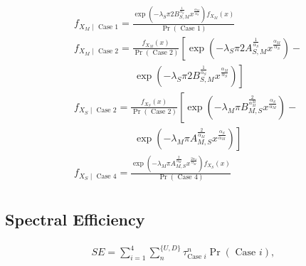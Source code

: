 \documentclass[conference]{IEEEtran}
\begin{document}
\begin{CJK*}{UTF8}{bsmi}
\begin{equation}
\begin{aligned}
& f_{X_M \mid \text { Case } 1}=\frac{\exp \left(-\lambda_S \pi 2 B_{S, M}^{\frac{1}{\alpha_S}} x^{\frac{\alpha_M}{\alpha_S}}\right) f_{X_M}(x)}{\operatorname{Pr}(\text { Case } 1)} \\
& f_{X_M \mid \text { Case } 2}=\frac{f_{X_M}(x)}{\operatorname{Pr}(\text { Case } 2)}\left[\exp \left(-\lambda_S \pi 2 A_{S, M}^{\frac{1}{\alpha_S}} x^{\frac{\alpha_M}{\alpha_S}}\right)-\right. \\
& \qquad\qquad\qquad\left.\exp \left(-\lambda_S \pi 2 B_{S, M}^{\frac{1}{\alpha_S}} x^{\frac{\alpha_M}{\alpha_S}}\right)\right] \\
& f_{X_S \mid \text { Case } 2}=\frac{f_{X_S}(x)}{\operatorname{Pr}(\text { Case } 2)}\left[\exp \left(-\lambda_M \pi B_{M, S}^{\frac{2}{\alpha_M^M}} x^{\frac{\alpha_S}{\alpha_M}}\right)-\right. \\
&\qquad\qquad\qquad \left.\exp \left(-\lambda_M \pi A_{M, S}^{\frac{2}{\alpha_M}} x^{\frac{\alpha_S}{\alpha_M}}\right)\right] \\
& f_{X_S \mid \text { Case } 4}=\frac{\exp \left(-\lambda_M \pi A_{M, S}^{\frac{2}{\alpha_M}} x^{\frac{2 \alpha_S}{\alpha_M}}\right) f_{X_S}(x)}{\operatorname{Pr}(\text { Case } 4)} \\
&
\end{aligned}
\end{equation}

\subsection{Spectral Efficiency}
\begin{equation}
\begin{aligned}
 S E=\sum_{i=1}^4 \sum_n^{\{U, D\}} \tau_{\text {Case } i}^n \operatorname{Pr}(\text { Case } i) \text {, } \\
\end{aligned}
\end{equation}\\


\end{CJK*}
\end{document}
